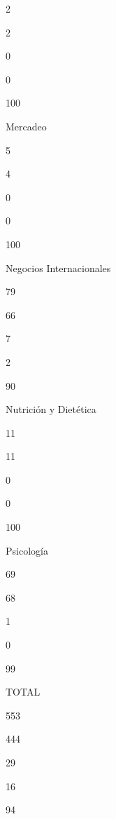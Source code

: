 \documentclass[
]{article}
\begin{document}
2

2

0

0

100

Mercadeo

5

4

0

0

100

Negocios Internacionales

79

66

7

2

90

Nutrición y Dietética

11

11

0

0

100

Psicología

69

68

1

0

99

TOTAL

553

444

29

16

94
\end{document}
